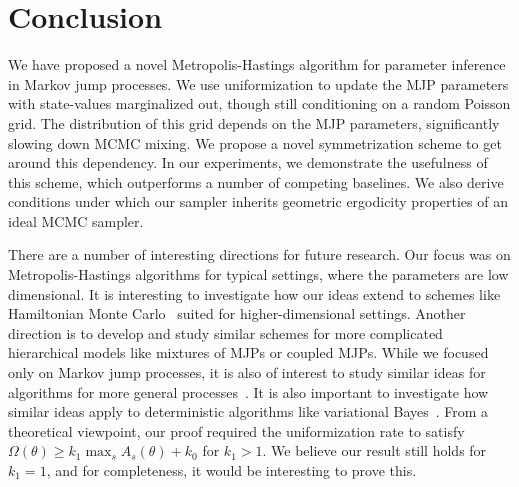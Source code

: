 \section{Conclusion}
We have proposed a novel Metropolis-Hastings algorithm for parameter 
inference in Markov jump processes. We use 
uniformization to update the MJP parameters with state-values marginalized 
out, though still conditioning on a random Poisson grid. The 
distribution of this grid depends on the MJP parameters, significantly 
slowing down MCMC mixing. We propose a novel symmetrization scheme to get 
around this dependency. In our experiments, we demonstrate the usefulness 
of this scheme, which outperforms a number of competing baselines.
We also derive conditions under which our sampler inherits geometric 
ergodicity properties of an ideal MCMC sampler.


There are a number of interesting directions for future research.
Our focus was on Metropolis-Hastings algorithms for typical settings,
where the parameters are low dimensional. It is interesting to 
investigate how our ideas extend to schemes like Hamiltonian Monte 
Carlo~\citep{Neal2010} suited for higher-dimensional settings. Another 
direction is to develop and study similar schemes for more complicated 
hierarchical models like mixtures of MJPs or coupled MJPs. While we 
focused only on Markov jump processes, it is also of interest to study 
similar ideas for algorithms for more general processes~\citep{RaoTeh12}. 
It is also important to investigate how similar ideas apply to 
deterministic algorithms like variational Bayes~\citep{OpperVarinf, panzharao17}. From 
a theoretical viewpoint, our proof required the uniformization rate to 
satisfy $\Omega(\theta) \ge k_1 \max_s A_s(\theta) + k_0$ for $k_1 > 1$. 
We believe our result still holds for $k_1 = 1$, and for completeness, 
it would be interesting to prove this.  
